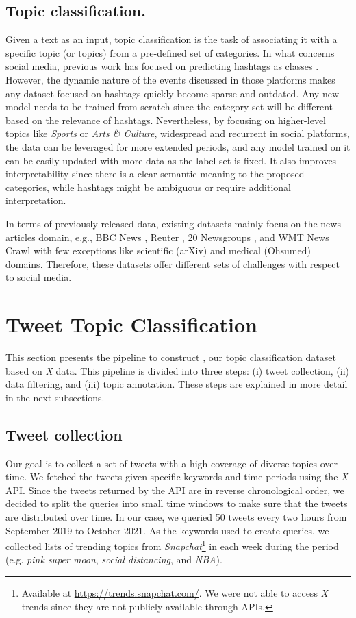 \subsection{Topic classification.}
Given a text as an input, topic classification is the task of associating it with a specific topic (or topics) from a pre-defined set of categories. In what concerns social media, previous work has focused on predicting hashtags as classes \cite{tweet2vec}. However, the dynamic nature of the events discussed in those platforms makes any dataset focused on hashtags quickly become sparse and outdated. Any new model needs to be trained from scratch since the category set will be different based on the relevance of hashtags. 
Nevertheless, by focusing on higher-level topics like \emph{Sports} or \emph{Arts \& Culture}, widespread and recurrent in social platforms, the data can be leveraged for more extended periods, and any model trained on it can be easily updated with more data as the label set is fixed. It also improves interpretability since there is a clear semantic meaning to the proposed categories, while hashtags might be ambiguous or require additional interpretation.

In terms of previously released data, existing datasets mainly focus on the news articles domain, e.g., BBC News \cite{greene2006practical}, Reuter \cite{lewis2004rcv1}, 20 Newsgroups \cite{lang1995newsweeder}, and WMT News Crawl \cite{lazaridou2021mind} with few exceptions like scientific (arXiv) \cite{lazaridou2021mind} and medical (Ohsumed) \cite{hersh1994ohsumed} domains. Therefore, these datasets offer different sets of challenges with respect to social media.


\section{Tweet Topic Classification}\label{data}

This section presents the pipeline to construct \TweetTopic, our topic classification dataset based on \textit{X} data. This pipeline is divided into three steps: (i) tweet collection, (ii) data filtering, and (iii) topic annotation. These steps are explained in more detail in the next subsections.

\subsection{Tweet collection}
Our goal is to collect a set of tweets with a high coverage of diverse topics over time. We fetched the tweets given specific keywords and time periods using the \textit{X} API. 
Since the tweets returned by the API are in reverse chronological order, we decided to split the queries into small time windows to make sure that the tweets are distributed over time. In our case, we queried 50 tweets every two hours from September 2019 to October 2021.
As the keywords used to create queries, we collected lists of trending topics from \textit{Snapchat}\footnote{Available at \url{https://trends.snapchat.com/}. We were not able to access \textit{X} trends since they are not publicly available through APIs.} in each week during the period
(e.g. \emph{pink super moon}, \emph{social distancing}, and \emph{NBA}).


